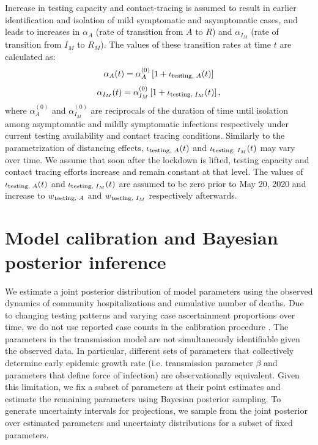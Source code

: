 \documentclass[11pt]{article}
\begin{document}
Increase in testing capacity and contact-tracing is assumed to result in earlier identification and isolation of mild symptomatic and asymptomatic cases, and leads to increases in $\alpha_A$ (rate of transition from $A$ to $R$) and $\alpha_{I_M}$ (rate of transition from $I_M$ to $R_M$). The values of these transition rates at time $t$ are calculated as:
\[ \alpha_A(t) = \alpha_A^{(0)} \left[ 1 + \iota\textsubscript{testing, $A$} (t) \right] \]
\[ \alpha_{I_M}(t) = \alpha_{I_M}^{(0)} \left[ 1 + \iota\textsubscript{testing, $I_M$} (t) \right], \]
where $\alpha_A^{(0)}$ and $\alpha_{I_M}^{(0)}$ are reciprocals of the duration of time until isolation among asymptomatic and mildly symptomatic infections respectively under current testing availability and contact tracing conditions. Similarly to the parametrization of distancing effects, $\iota\textsubscript{testing, $A$} (t)$ and $\iota\textsubscript{testing, $I_M$} (t)$ may vary over time. 
We assume that soon after the lockdown is lifted, testing capacity and contact tracing efforts increase and remain constant at that level. The values of $\iota\textsubscript{testing, $A$} (t)$ and $\iota\textsubscript{testing, $I_M$} (t)$ are assumed to be zero prior to May 20, 2020 and increase to $w\textsubscript{testing, $A$}$ and $w\textsubscript{testing, $I_M$}$ respectively afterwards.  





\section{Model calibration and Bayesian posterior inference}


We estimate a joint posterior distribution of model parameters using the observed dynamics of community hospitalizations and cumulative number of deaths.  Due to changing testing patterns and varying case ascertainment proportions over time, we do not use reported case counts in the calibration procedure \citep{holmdahl2020wrong, pitzer2020impact}.  The parameters in the transmission model are not simultaneously identifiable given the observed data. In particular, different sets of parameters that collectively determine early epidemic growth rate (i.e. transmission parameter $\beta$ and parameters that define force of infection) are observationally equivalent. Given this limitation, we fix a subset of parameters at their point estimates and estimate the remaining parameters using Bayesian posterior sampling.  To generate uncertainty intervals for projections, we sample from the joint posterior over estimated parameters and uncertainty distributions for a subset of fixed parameters. 
\end{document}

